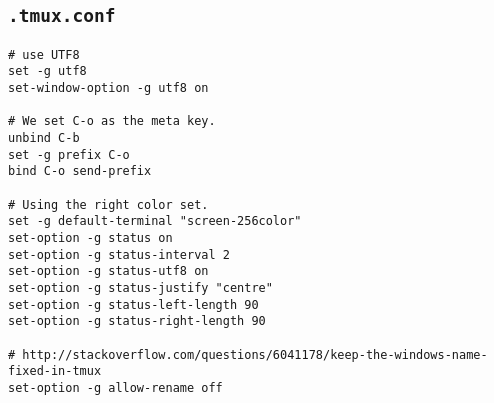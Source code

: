 \documentclass[../main/main.tex]{subfiles}
\begin{document}
\subsection{\lstinline|.tmux.conf|}

\begin{lstlisting}
# use UTF8
set -g utf8
set-window-option -g utf8 on

# We set C-o as the meta key. 
unbind C-b
set -g prefix C-o
bind C-o send-prefix

# Using the right color set. 
set -g default-terminal "screen-256color"
set-option -g status on
set-option -g status-interval 2
set-option -g status-utf8 on
set-option -g status-justify "centre"
set-option -g status-left-length 90
set-option -g status-right-length 90

# http://stackoverflow.com/questions/6041178/keep-the-windows-name-fixed-in-tmux
set-option -g allow-rename off
\end{lstlisting}
\end{document}
